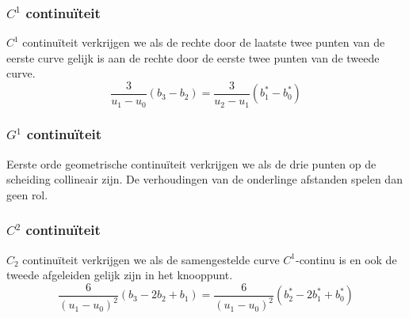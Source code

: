 \documentclass[computergesteund_ontwerp_van_curven_en_oppervlakken.tex]{subfiles}
\begin{document}
\subsubsection{$C^{1}$ continu\"iteit}
$C^{1}$ continu\"iteit verkrijgen we als de rechte door de laatste twee punten van de eerste curve gelijk is aan de rechte door de eerste twee punten van de tweede curve.
\[
\frac{3}{u_1-u_0}(b_3-b_2) = \frac{3}{u_2-u_1}(b_1^{*}-b_0^{*})
\]

\subsubsection{$G^{1}$ continu\"iteit}
Eerste orde geometrische continu\"iteit verkrijgen we als de drie punten op de scheiding collineair zijn. De verhoudingen van de onderlinge afstanden spelen dan geen rol.

\subsubsection{$C^{2}$ continu\"iteit}
$C_{2}$ continu\"iteit verkrijgen we als de samengestelde curve $C^{1}$-continu is en ook de tweede afgeleiden gelijk zijn in het knooppunt.
\[
\frac{6}{(u_1-u_0)^2}(b_3-2b_2+b_1)
= \frac{6}{(u_1-u_0)^2}(b_2^*-2b_1^*+b_0^*)
\]
\end{document}
